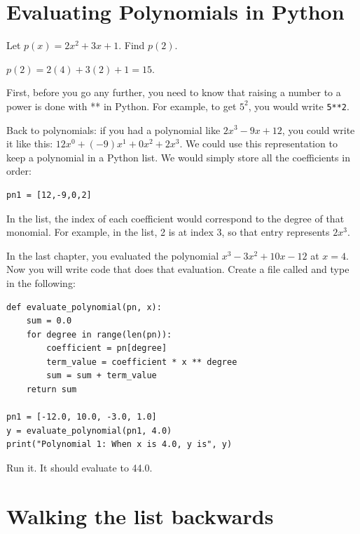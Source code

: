 \section{Evaluating Polynomials in Python}

\begin{Worked}
\begin{Problem}
Let $p(x) = 2x^2 + 3x + 1$. Find $p(2)$.
\end{Problem}
\begin{Solution}
$p(2) = 2(4) + 3(2) + 1 = 15$.
\end{Solution}
\end{Worked}


First, before you go any further, you need to know that raising a
number to a power is done with ** in Python.  For example, to get
$5^2$, you would write \texttt{5**2}.

Back to polynomials: if you had a polynomial like $2x^3 -9x + 12$, you
could write it like this: $12x^0 + (-9)x^1 + 0x^2 + 2x^3$.  We could
use this representation to keep a polynomial in a Python list. We
would simply store all the coefficients in order:
\begin{verbatim}
pn1 = [12,-9,0,2]
\end{verbatim}

In the list, the index of each coefficient would correspond to the
degree of that monomial. For example, in the list, 2 is at index 3, so
that entry represents $2x^3$.

In the last chapter, you evaluated the polynomial $x^3 - 3x^2 + 10x -
12$ at $x=4$. Now you will write code that does that evaluation.
Create a file called  and type in the following:

\begin{verbatim}
def evaluate_polynomial(pn, x):
    sum = 0.0  
    for degree in range(len(pn)):
        coefficient = pn[degree]
        term_value = coefficient * x ** degree
        sum = sum + term_value
    return sum
   
pn1 = [-12.0, 10.0, -3.0, 1.0]
y = evaluate_polynomial(pn1, 4.0)
print("Polynomial 1: When x is 4.0, y is", y)
\end{verbatim}

Run it. It should evaluate to 44.0.

\section{Walking the list backwards}

